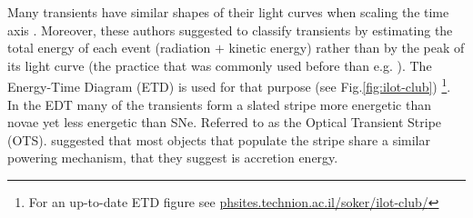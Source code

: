 \documentclass[a4paper,modern]{aastex62}
\begin{document}
Many transients have similar shapes of their light curves when scaling the time axis \citep{2010ApJ...709L..11K}.
Moreover, these authors suggested to classify transients by estimating the total energy of each event (radiation $+$ kinetic energy) rather than by the peak of its light curve (the practice that was commonly used before than e.g. \citealt{2007Natur.447..458K}).
The Energy-Time Diagram (ETD) is used for that purpose (see Fig.\ref{fig:ilot-club}) \footnote{For an up-to-date ETD figure see \url{phsites.technion.ac.il/soker/ilot-club/} }.
In the EDT many of the transients form a slated stripe more energetic than novae yet less energetic than SNe.
Referred to as the Optical Transient Stripe (OTS).
\cite{2010arXiv1011.1222K} suggested that most objects that populate the stripe share a similar powering mechanism, that they suggest is accretion energy.
\end{document}
